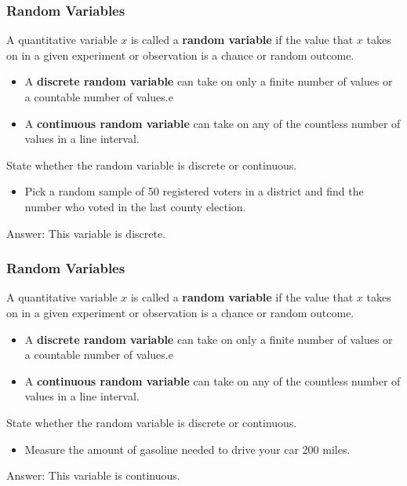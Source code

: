 \documentclass[Lecture.tex]{subfiles}
\begin{document}
\begin{frame}
\frametitle{Random Variables}
\begin{definition}
A quantitative variable $x$ is called a \textbf{random variable} if the value that $x$ takes on in a given experiment or observation is a chance or random outcome.
\begin{itemize}
\item A \textbf{discrete random variable} can take on only a finite number of values or a countable number of values.e
\item A \textbf{continuous random variable} can take on any of the countless number of values in a line interval.
\end{itemize}
\end{definition}
\begin{example}
State whether the random variable is discrete or continuous.
\begin{itemize}
\item Pick a random sample of 50 registered voters in a district and find the number who voted in the last county election.
\end{itemize}\pause
\begin{flushright}Answer: This variable is discrete.\end{flushright}
\end{example}
\end{frame}

\begin{frame}
\frametitle{Random Variables}
\begin{definition}
A quantitative variable $x$ is called a \textbf{random variable} if the value that $x$ takes on in a given experiment or observation is a chance or random outcome.
\begin{itemize}
\item A \textbf{discrete random variable} can take on only a finite number of values or a countable number of values.e
\item A \textbf{continuous random variable} can take on any of the countless number of values in a line interval.
\end{itemize}
\end{definition}
\begin{example}
State whether the random variable is discrete or continuous.
\begin{itemize}
\item Measure the amount of gasoline needed to drive your car 200 miles.
\end{itemize}\pause
\begin{flushright}Answer: This variable is continuous.\end{flushright}
\end{example}
\end{frame}
\end{document}
